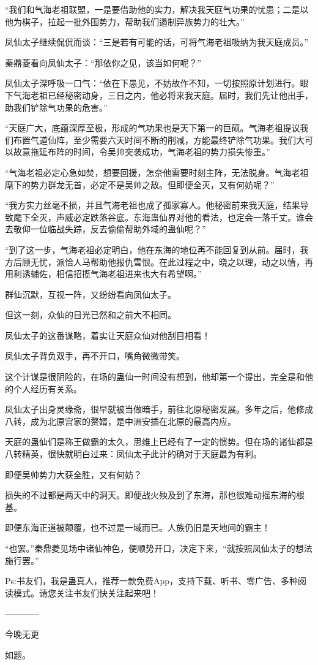 \begin{this_body}
“我们和气海老祖联盟，一是要借助他的实力，解决我天庭气功果的忧患；二是以他为棋子，拉起一批外围势力，帮助我们遏制异族势力的壮大。”

凤仙太子继续侃侃而谈：“三是若有可能的话，可将气海老祖吸纳为我天庭成员。”

秦鼎菱看向凤仙太子：“那依你之见，该当如何呢？”

凤仙太子深呼吸一口气：“依在下愚见，不妨故作不知，一切按照原计划进行。眼下气海老祖已经秘密动身，三日之内，他必将来我天庭。届时，我们先让他出手，助我们铲除气功果的危害。”

“天庭广大，底蕴深厚至极，形成的气功果也是天下第一的巨硕。气海老祖提议我们布置气道仙阵，至少需要六天时间不断的削减，方能最终铲除气功果。我们大可以故意拖延布阵的时间，令吴帅突袭成功，气海老祖的势力损失惨重。”

“气海老祖必定心急如焚，想要回援，怎奈他需要时刻主阵，无法脱身。气海老祖麾下的势力群龙无首，必定不是吴帅之敌。但即便全灭，又有何妨呢？”

“我方实力丝毫不损，并且气海老祖也成了孤家寡人。他秘密前来我天庭，结果导致麾下全灭，声威必定跌落谷底。东海蛊仙界对他的看法，也定会一落千丈。谁会去敬仰一位临战失踪，反去偷偷帮助外域的蛊仙呢？”

“到了这一步，气海老祖必定明白，他在东海的地位再不能回复到从前。届时，我方后顾无忧，派恰人马帮助他报仇雪恨。在此过程之中，晓之以理，动之以情，再用利诱辅佐，相信招揽气海老祖进来也大有希望啊。”

群仙沉默，互视一阵，又纷纷看向凤仙太子。

但这一刻，众仙的目光已然和之前大不相同。

凤仙太子的这番谋略，着实让天庭众仙对他刮目相看！

凤仙太子背负双手，再不开口，嘴角微微带笑。

这个计谋是很阴险的，在场的蛊仙一时间没有想到，他却第一个提出，完全是和他的个人经历有关系。

凤仙太子出身灵缘斋，很早就被当做暗手，前往北原秘密发展。多年之后，他修成八转，成为北原宫家的赘婿，是中洲安插在北原的最高内应。

天庭的蛊仙们是称王做霸的太久，思维上已经有了一定的惯势。但在场的诸仙都是八转精英，很快就明白过来：凤仙太子此计的确对于天庭最为有利。

即便吴帅势力大获全胜，又有何妨？

损失的不过都是两天中的洞天。即便战火殃及到了东海，那也很难动摇东海的根基。

即便东海正道被颠覆，也不过是一域而已。人族仍旧是天地间的霸主！

“也罢。”秦鼎菱见场中诸仙神色，便顺势开口，决定下来，“就按照凤仙太子的想法施行罢。”

Ps:书友们，我是蛊真人，推荐一款免费App，支持下载、听书、零广告、多种阅读模式。请您关注书友们快关注起来吧！

------------

今晚无更

如题。

\end{this_body}

